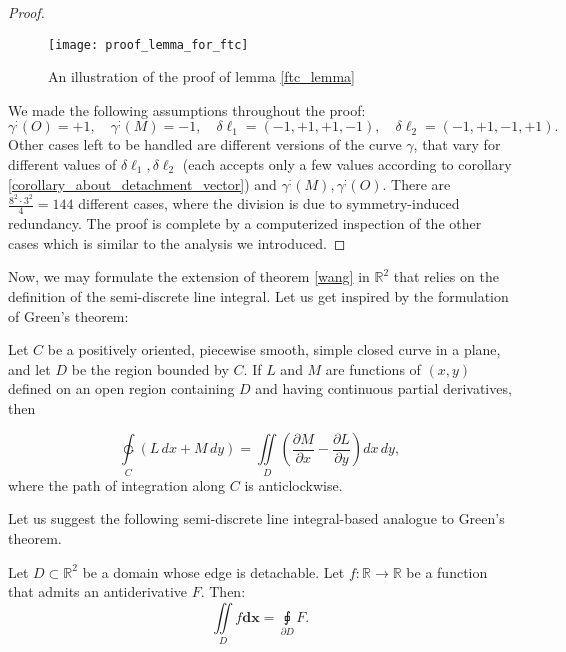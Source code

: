 \documentclass[11pt]{book}
\begin{document}
\begin{proof}
\begin{figure}[H]
\texttt{[image: proof\_lemma\_for\_ftc]}
\caption{An illustration of the proof of lemma \ref{ftc_lemma}}
\label{ftc_lemma_figure}
\end{figure}

We made the following assumptions throughout the proof:
\[
\gamma^{;}\left(O\right)=+1,\quad\gamma^{;}\left(M\right)=-1,\quad\delta\ell_{1}=\left(-1,+1,+1,-1\right),\quad\delta\ell_{2}=\left(-1,+1,-1,+1\right).
\]
Other cases left to be handled are different versions of the
curve $\gamma$, that vary for different values of $\delta\ell_{1},\delta\ell_{2}$
(each accepts only a few values according to corollary \ref{corollary_about_detachment_vector}) and $\gamma^{;}\left(M\right),\gamma^{;}\left(O\right)$.
There are $\frac{8^{2}\cdot3^{2}}{4}=144$ different cases, where
the division is due to symmetry-induced redundancy. The proof is complete
by a computerized inspection of the other cases which is similar to
the analysis we introduced.
\end{proof}

Now, we may formulate the extension of theorem \ref{wang}
in $\mathbb{R}^{2}$ that relies on the definition of the semi-discrete
line integral. Let us get inspired by the formulation of Green's theorem:
\begin{theorem}Let $C$ be a positively oriented, piecewise smooth, simple closed
curve in a plane, and let $D$ be the region bounded by $C$. If $L$
and $M$ are functions of $\left(x,y\right)$ defined on an open region
containing $D$ and having continuous partial derivatives, then

\[
\underset{C}{\ointctrclockwise}{\displaystyle \left(L\,dx+M\,dy\right)}{\displaystyle =\underset{D}{\iint}\left(\frac{\partial M}{\partial x}-\frac{\partial L}{\partial y}\right)dx\,dy},
\]
 where the path of integration along $C$ is anticlockwise.
\label{green_theorem}
\end{theorem}

Let us suggest the following semi-discrete line integral-based analogue to Green's theorem.
\begin{theorem}Let $D\subset\mathbb{R}^{2}$ be a domain whose edge is detachable.
Let $f:\mathbb{R}\rightarrow\mathbb{R}$ be a function that admits
an antiderivative $F$. Then:
\[
\underset{D}{\iint}f\boldsymbol{dx}=\underset{\partial D}{\sqint}F.
\]
\label{ftc_theorem}
\end{theorem}
\end{document}
